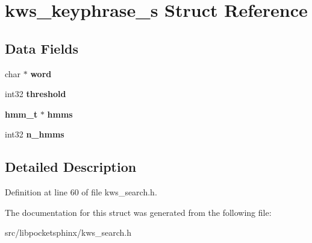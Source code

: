 \section{kws\+\_\+keyphrase\+\_\+s Struct Reference}
\label{structkws__keyphrase__s}
\subsection*{Data Fields}
\begin{DoxyCompactItemize}
\item 
\mbox{\label{structkws__keyphrase__s_ab75a1433c652de3692794513566d3388}} 
char $\ast$ {\bfseries word}
\item 
\mbox{\label{structkws__keyphrase__s_a403e2768765e9cd3896e6a772d832dce}} 
int32 {\bfseries threshold}
\item 
\mbox{\label{structkws__keyphrase__s_a51271131b1a0ea63aec3f4efb68a52a2}} 
\textbf{ hmm\+\_\+t} $\ast$ {\bfseries hmms}
\item 
\mbox{\label{structkws__keyphrase__s_a80f4c3ca2a0741b2550f744684cd887d}} 
int32 {\bfseries n\+\_\+hmms}
\end{DoxyCompactItemize}


\subsection{Detailed Description}


Definition at line 60 of file kws\+\_\+search.\+h.



The documentation for this struct was generated from the following file\+:\begin{DoxyCompactItemize}
\item 
src/libpocketsphinx/kws\+\_\+search.\+h\end{DoxyCompactItemize}
